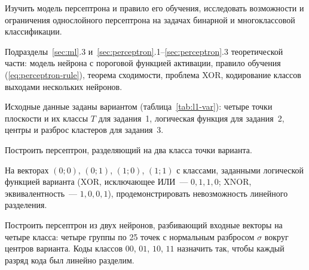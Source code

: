 
Изучить модель персептрона и правило его обучения, исследовать возможности и ограничения однослойного
персептрона на задачах бинарной и многоклассовой классификации.

Подразделы~\ref{sec:ml}.3 и~\ref{sec:perceptron}.1--\ref{sec:perceptron}.3 теоретической части: модель
нейрона с пороговой функцией активации, правило обучения (\ref{eq:perceptron-rule}), теорема
сходимости, проблема XOR, кодирование классов выходами нескольких нейронов.

Исходные данные заданы вариантом (таблица~\ref{tab:l1-var}): четыре точки плоскости и их классы $T$ для
задания~1, логическая функция для задания~2, центры и разброс кластеров для задания~3.
\begin{steps}
\item Построить персептрон, разделяющий на два класса точки варианта.
\item На векторах $(0; 0)$, $(0; 1)$, $(1; 0)$, $(1; 1)$ с классами, заданными логической функцией
варианта (XOR, исключающее ИЛИ~--- $0, 1, 1, 0$; XNOR, эквивалентность~--- $1, 0, 0, 1$),
продемонстрировать невозможность линейного разделения.
\item Построить персептрон из двух нейронов, разбивающий входные векторы на четыре класса: четыре
группы по 25 точек с нормальным разбросом $\sigma$ вокруг центров варианта. Коды классов $00$, $01$, $10$,
$11$ назначить так, чтобы каждый разряд кода был линейно разделим.
\end{steps}

